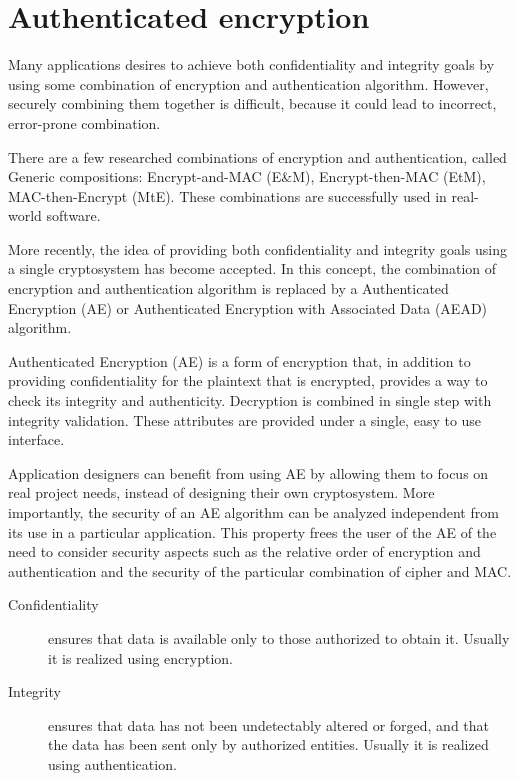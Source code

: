 \section{Authenticated encryption}

Many applications desires to achieve both confidentiality and integrity goals by using some combination of encryption and authentication algorithm. However, securely combining them together is difficult, because it could lead to incorrect, error-prone combination.

There are a few researched combinations of encryption and authentication, called Generic compositions: Encrypt-and-MAC (E\&M), Encrypt-then-MAC (EtM), MAC-then-Encrypt (MtE). These combinations are successfully used in real-world software.

More recently, the idea of providing both confidentiality and integrity goals using a single cryptosystem has become accepted. In this concept, the combination of encryption and authentication algorithm is replaced by a Authenticated Encryption (AE) or Authenticated Encryption with Associated Data (AEAD) algorithm.

Authenticated Encryption (AE) is a form of encryption that, in addition to providing confidentiality for the plaintext that is encrypted, provides a way to check its integrity and authenticity. Decryption is combined in single step with integrity validation. These attributes are provided under a single, easy to use interface.

Application designers can benefit from using AE by allowing them to focus on real project needs, instead of designing their own cryptosystem. More importantly, the security of an AE algorithm can be analyzed independent from its use in a particular application. This property frees the user of the AE of the need to consider security aspects such as the relative order of encryption and authentication and the security of the particular combination of cipher and MAC.

\begin{description}
  \item[Confidentiality] ensures that data is available only to those authorized to obtain it. Usually it is realized using encryption.
  \item[Integrity] ensures that data has not been undetectably altered or forged, and that the data has been sent only by authorized entities. Usually it is realized using authentication.
\end{description}


